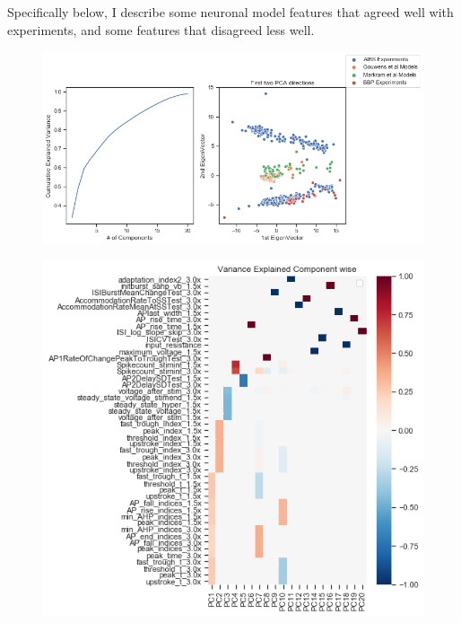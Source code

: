 Specifically below, I describe some neuronal model features that agreed well with experiments, and some features that disagreed less well.
\begin{figure}    
\begin{center}

\includegraphics[width=0.7\linewidth]{figures/cortical_model_data_agreement_52_1.png}
\end{center}
\end{figure}    
\begin{figure}    
\begin{center}
\includegraphics[width=0.7\linewidth]{../figures/cortical_model_data_agreement_54_1.png}
\end{center}
\end{figure}    

